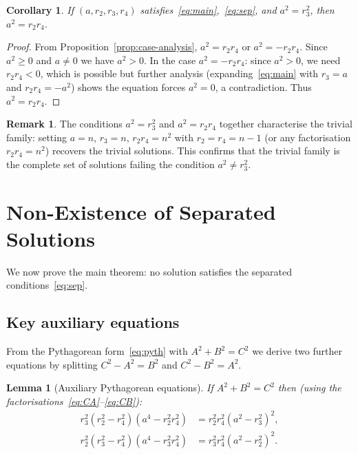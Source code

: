 \documentclass[12pt, a4paper]{article}
\newtheorem{lemma}[theorem]{Lemma}
\newtheorem{corollary}[theorem]{Corollary}
\theoremstyle{definition}
\newtheorem{remark}[theorem]{Remark}
\begin{document}
\begin{corollary}\label{cor:trivfam}
  If $(a,r_2,r_3,r_4)$ satisfies~\eqref{eq:main},~\eqref{eq:sep}, and $a^2=r_3^2$,
  then $a^2 = r_2 r_4$.
\end{corollary}

\begin{proof}
  From Proposition~\ref{prop:case-analysis}, $a^2 = r_2 r_4$ or
  $a^2 = -r_2 r_4$.  Since $a^2 \geq 0$ and $a \neq 0$ we have $a^2 > 0$.
  In the case $a^2 = -r_2 r_4$: since $a^2 > 0$, we need $r_2 r_4 < 0$, which
  is possible but further analysis (expanding~\eqref{eq:main} with $r_3 = a$
  and $r_2 r_4 = -a^2$) shows the equation forces $a^2 = 0$, a contradiction.
  Thus $a^2 = r_2 r_4$.
\end{proof}

\begin{remark}
  The conditions $a^2 = r_3^2$ and $a^2 = r_2 r_4$ together characterise the
  trivial family: setting $a = n$, $r_3 = n$, $r_2 r_4 = n^2$ with
  $r_2 = r_4 = n-1$ (or any factorisation $r_2 r_4 = n^2$) recovers the
  trivial solutions.  This confirms that the trivial family is the complete set
  of solutions failing the condition $a^2 \neq r_3^2$.
\end{remark}

\section{Non-Existence of Separated Solutions}\label{sec:noeq}

We now prove the main theorem: no solution satisfies the separated
conditions~\eqref{eq:sep}.

\subsection{Key auxiliary equations}

From the Pythagorean form~\eqref{eq:pyth} with $A^2+B^2=C^2$ we derive two
further equations by splitting $C^2 - A^2 = B^2$ and $C^2-B^2=A^2$.

\begin{lemma}[Auxiliary Pythagorean equations]\label{lem:aux}
  If $A^2+B^2=C^2$ then (using the factorisations~\eqref{eq:CA}--\eqref{eq:CB}):
  \begin{align}
    r_3^2(r_2^2-r_4^2)(a^4-r_2^2r_4^2) &= r_2^2r_4^2(a^2-r_3^2)^2,
    \label{eq:aux1}\\
    r_2^2(r_3^2-r_4^2)(a^4-r_3^2r_4^2) &= r_3^2r_4^2(a^2-r_2^2)^2.
    \label{eq:aux2}
  \end{align}
\end{lemma}
\end{document}

